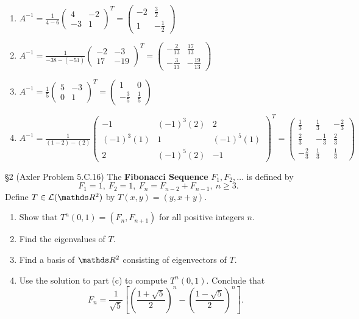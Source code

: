 \documentclass{review-sheet}
\begin{document}
\begin{solution}
  \begin{enumerate}[label=(\alph*)]
    \item $A^{-1}=\frac{1}{4-6}\begin{pmatrix} 4&-2\\-3&1 \end{pmatrix}^T =\begin{pmatrix}
      -2&\frac{3}{2}\\ 1&-\frac{1}{2} \end{pmatrix} $
    \item $A^{-1}=\frac{1}{-38-(-51)}\begin{pmatrix} -2&-3\\17&-19 \end{pmatrix}^T =\begin{pmatrix}
      -\frac{2}{13}&\frac{17}{13}\\-\frac{3}{13}&-\frac{19}{13} \end{pmatrix} $
    \item $A^{-1}=\frac{1}{5}\begin{pmatrix} 5&-3\\0&1 \end{pmatrix}^T =\begin{pmatrix}
      1&0\\-\frac{3}{5}&\frac{1}{5} \end{pmatrix} $
    \item $A^{-1}=\frac{1}{(1-2)-(2)}\begin{pmatrix} -1 & (-1)^3(2) & 2\\ (-1)^3(1)&1&(-1)^5(1)\\
        2&(-1)^5(2)&-1 \end{pmatrix}^T=\begin{pmatrix}
      \frac{1}{3}&\frac{1}{3}&-\frac{2}{3}\\\frac{2}{3}&-\frac{1}{3}
                 &\frac{2}{3}\\-\frac{2}{3}&\frac{1}{3}&\frac{1}{3} \end{pmatrix} $
  \end{enumerate}
\end{solution}

\begin{problem}{\S 2}
  (Axler Problem 5.C.16) The \textbf{Fibonacci Sequence} $F_1,F_2,\ldots$ is defined by \[
    F_1=1,\ F_2=1,\ F_n=F_{n-2}+F_{n-1},\ n\ge 3
  .\] Define $T\in \mc{L}(\R^2)$ by $T(x,y)=(y,x+y)$.
  \begin{enumerate}[label=(\alph*)]
    \item Show that $T^n(0,1)=(F_n,F_{n+1})$ for all positive integers $n$.
    \item Find the eigenvalues of $T$.
    \item Find a basis of $\R^2$ consisting of eigenvectors of $T$.
    \item Use the solution to part (c) to compute $T^n(0,1)$. Conclude that \[
        F_n=\frac{1}{\sqrt{5}}\left[ \left( \frac{1+\sqrt{5}}{2} \right) ^n-\left(
        \frac{1-\sqrt{5}}{2} \right)^n \right] 
    .\] 

  \end{enumerate}
\end{problem}
\end{document}
